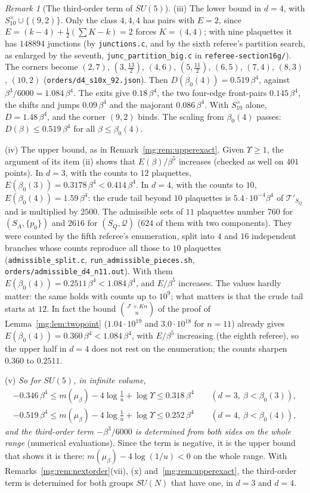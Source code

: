 \documentclass[11pt,a4paper]{article}
\theoremstyle{definition}
\theoremstyle{remark}
\newtheorem{remark}[theorem]{Remark}
\begin{document}
\begin{remark}[The third-order term of $SU(5)$]
(iii) The lower bound in $d=4$, with $S^\times_{10}\cup\{(9,2)\}$. Only the class $4,4,4$ has pairs with $E=2$, since $E=(k-4)+\frac12(\sum K-k)=2$ forces $K=(4,4)$; with nine plaquettes it has
$148894$ junctions (by \texttt{junctions.c}, and by the sixth referee's partition search, as enlarged by the seventh, \texttt{junc\_partition\_big.c} in
\texttt{referee-section16g/}). The corners become $(2,7)$, $(3,\frac{13}2)$, $(4,6)$, $(5,\frac{11}2)$, $(6,5)$,
$(7,4)$, $(8,3)$, $(10,2)$ (\texttt{orders/d4\_s10x\_92.json}). Then $D(\beta_0(4))=0.519\,\beta^4$, against $\beta^3/6000=1.084\,\beta^4$. The exits give $0.18\,\beta^4$, the two four-edge front-pairs $0.145\,\beta^4$,
the shifts and jumps $0.09\,\beta^4$ and the majorant $0.086\,\beta^4$. With $S^\times_{10}$ alone, $D=1.48\,\beta^4$, and the corner $(9,2)$ binds. The scaling from $\beta_0(4)$ passes: $D(\beta)\le0.519\,\beta^4$ for all $\beta\le\beta_0(4)$.

(iv) The upper bound, as in Remark~\ref{mg:rem:upperexact}. Given $\Upsilon\ge1$, the argument of its item (ii) shows that $E(\beta)/\beta^5$ increases (checked as well on $401$ points). In $d=3$, with the counts to $12$ plaquettes, $E(\beta_0(3))=0.3178\,\beta^4<0.414\,\beta^4$.
In $d=4$, with the counts to $10$, $E(\beta_0(4))=1.59\,\beta^4$: the crude tail beyond $10$ plaquettes is $5.4\cdot10^{-4}\beta^4$ of $\mathcal T'_{S_Q}$ and is multiplied by $2500$. The admissible sets of $11$
plaquettes number $760$ for $(S_A,\{p_0\})$ and $2616$ for $(S_Q,\mathcal Q)$ ($624$ of them with two components). They were counted by the fifth referee's enumeration, split into $4$
and $16$ independent branches whose counts reproduce all those to $10$ plaquettes (\texttt{admissible\_split.c}, \texttt{run\_admissible\_pieces.sh},
\texttt{orders/admissible\_d4\_n11.out}). With them $E(\beta_0(4))=0.2511\,\beta^4<1.084\,\beta^4$, and $E/\beta^5$ increases. The values hardly matter: the same holds with counts up to $10^9$;
what matters is that the crude tail starts at $12$. In fact the bound $\binom{J'+Kn}n$ of the proof of Lemma~\ref{mg:lem:twopoint} ($1.04\cdot10^{19}$ and $3.0\cdot10^{18}$ for
$n=11$) already gives $E(\beta_0(4))=0.360\,\beta^4<1.084\,\beta^4$, with $E/\beta^5$ increasing (the eighth referee), so the upper half in $d=4$ does not rest on the enumeration; the counts
sharpen $0.360$ to $0.2511$.

(v) \emph{So for $SU(5)$, in infinite volume,
\begin{gather*}
-0.346\,\beta^4\le m(\mu_\beta)-4\log\frac1u+\log\Upsilon\le0.318\,\beta^4\qquad(d=3,\ \beta<\beta_0(3)),\\
-0.519\,\beta^4\le m(\mu_\beta)-4\log\frac1u+\log\Upsilon\le0.252\,\beta^4\qquad(d=4,\ \beta<\beta_0(4)),
\end{gather*}
and the third-order term $-\beta^3/6000$ is determined from both sides on the whole range} (numerical evaluations). Since the term is negative, it is the upper bound that shows it
is there: $m(\mu_\beta)-4\log(1/u)<0$ on the whole range. With Remarks~\ref{mg:rem:nextorder}(vii), (x) and~\ref{mg:rem:upperexact}, the third-order term is determined for both
groups $SU(N)$ that have one, in $d=3$ and $d=4$.


\end{remark}
\end{document}
